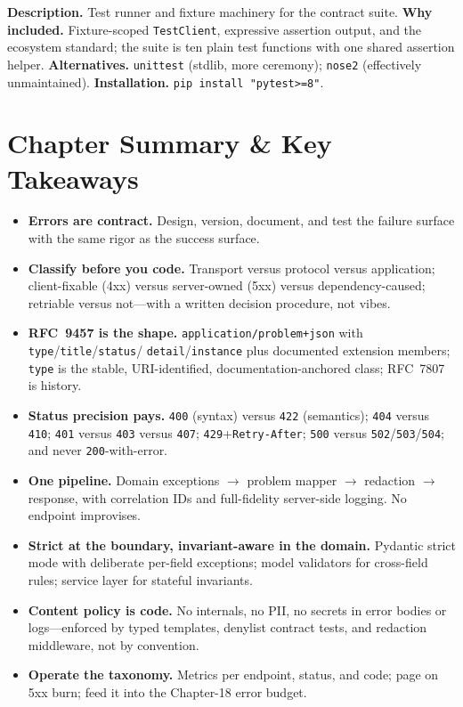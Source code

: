 \textbf{Description.} Test runner and fixture machinery for the contract
suite. \textbf{Why included.} Fixture-scoped \texttt{TestClient}, expressive
assertion output, and the ecosystem standard; the suite is ten plain test
functions with one shared assertion helper. \textbf{Alternatives.}
\texttt{unittest} (stdlib, more ceremony); \texttt{nose2} (effectively
unmaintained). \textbf{Installation.} \texttt{pip install "pytest>=8"}.

\section{Chapter Summary \& Key Takeaways}

\begin{itemize}
  \item \textbf{Errors are contract.} Design, version, document, and test
        the failure surface with the same rigor as the success surface.
  \item \textbf{Classify before you code.} Transport versus protocol versus
        application; client-fixable (4xx) versus server-owned (5xx) versus
        dependency-caused; retriable versus not---with a written decision
        procedure, not vibes.
  \item \textbf{RFC~9457 is the shape.} \texttt{application/problem+json}
        with \texttt{type}/\texttt{title}/\texttt{status}/
        \texttt{detail}/\texttt{instance} plus documented extension members;
        \texttt{type} is the stable, URI-identified, documentation-anchored
        class; RFC~7807 is history.
  \item \textbf{Status precision pays.} \texttt{400} (syntax) versus
        \texttt{422} (semantics); \texttt{404} versus \texttt{410};
        \texttt{401} versus \texttt{403} versus \texttt{407};
        \texttt{429}+\texttt{Retry-After}; \texttt{500} versus
        \texttt{502}/\texttt{503}/\texttt{504}; and never
        \texttt{200}-with-error.
  \item \textbf{One pipeline.} Domain exceptions $\rightarrow$ problem
        mapper $\rightarrow$ redaction $\rightarrow$ response, with
        correlation IDs and full-fidelity server-side logging. No endpoint
        improvises.
  \item \textbf{Strict at the boundary, invariant-aware in the domain.}
        Pydantic strict mode with deliberate per-field exceptions; model
        validators for cross-field rules; service layer for stateful
        invariants.
  \item \textbf{Content policy is code.} No internals, no PII, no secrets in
        error bodies or logs---enforced by typed templates, denylist
        contract tests, and redaction middleware, not by convention.
  \item \textbf{Operate the taxonomy.} Metrics per endpoint, status, and
        code; page on 5xx burn; feed it into the Chapter-18 error budget.
\end{itemize}

